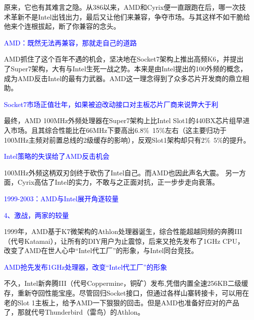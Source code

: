 \documentclass[utf8]{book}
\begin{document}
	原来，它也有其难言之隐。从386以来，AMD和Cyrix便一直跟跑在后，哪一次技术革新不是Intel出钱出力，最后又让他们来兼容，争夺市场。与其这样不如干脆给他来个连根拔起，断了你兼容的念头。

	\begin{flushleft}
		{\large \textcolor{blue}{AMD：既然无法再兼容，那就走自己的道路\\}}
	\end{flushleft}
	
	AMD抓住了这个百年不遇的机会，坚决地在Socket7架构上推出高频K6，并提出了Super7架构，大有与Intel生死一战之势。本来是由Intel提出的100外频的概念，成为AMD反击Intel的最有力武器。AMD这一理念得到了众多芯片开发商的鼎立相助。

	\begin{flushleft}
		{\large \textcolor{blue}{Socket7市场正值壮年，如果被迫改动接口对主板芯片厂商来说弊大于利\\}}
	\end{flushleft}
	
	最终，AMD 100MHz外频处理器在Super7架构上比Intel Slot1的440BX芯片组早进入市场。且其综合性能比在66MHz下要高出6.8\%~15\%左右（这主要归功于100MHz主频对前置总线的2级缓存的影响），反观Slot1架构却只有2\%~5\%的提升。

	\begin{flushleft}
		{\large \textcolor{blue}{Intel策略的失误给了AMD反击机会\\}}
	\end{flushleft}
	
	100MHz外频这柄双刃剑终于砍伤了Intel自己。而AMD也因此声名大震。 另一方面，Cyrix高估了Intel的实力，不敢与之正面对抗，正一步步走向衰落。

	\begin{flushleft}
		{\Large \textcolor{blue}{1999-2003：AMD与Intel展开角逐较量}}
	\end{flushleft}

		\begin{flushleft}
		{\large \textcolor{blue}{4、激战，两家的较量\\}}
	\end{flushleft}
	1999年，AMD基于K7微架构的Athlon处理器诞生，综合性能超越同频的奔腾III（代号Katamai），让所有的DIY用户为止震惊，后来又抢先发布了1GHz CPU，改变了AMD在世人心中“Intel代工厂”的形象，与Intel同台竞技。

	\begin{flushleft}
		{\large \textcolor{blue}{AMD抢先发布1GHz处理器，改变“Intel代工厂”的形象\\}}
	\end{flushleft}
	不久，Intel新奔腾III（代号Coppermine，铜矿）发布,凭借内置全速256KB二级缓存，重新夺回性能宝座。尽管回归Socket接口，但通过各样山寨转接卡，可以用在老的Slot 1主板上，给予AMD一下狠狠的回击。但是AMD也准备好应对的产品了，那就代号Thunderbird（雷鸟）的Athlon。
\end{document}

